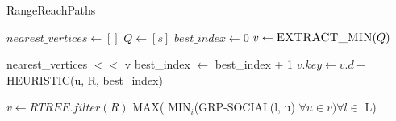 {%




\begin{algorithm}[t]
\caption{RangeReachPaths}
\label{alg3}
\begin{algorithmic}[1]
	\State $nearest\_vertices \gets []$
	\State $Q \gets [s]$
	\State $best\_index \gets 0$
		\State $v \gets \Call{EXTRACT\_MIN}{Q}$
		
			\State nearest\_vertices $<<$ v 
			\State best\_index $\gets$ best\_index + 1
				\State \Return {}
			\EndIf
			 
				\State $v.key \gets v.d +$ HEURISTIC(u, R, best\_index)
			\EndFor
		\EndIf
		
			\State {}
		\EndIf
	\EndWhile
\EndFunction

	\State $v \gets RTREE.filter(R)$   	
	\State \Return MAX( MIN$_i$(GRP-SOCIAL(l, u) $\forall u \in v) \forall l \in$ L)
\EndFunction


\end{algorithmic}
\end{algorithm}}

